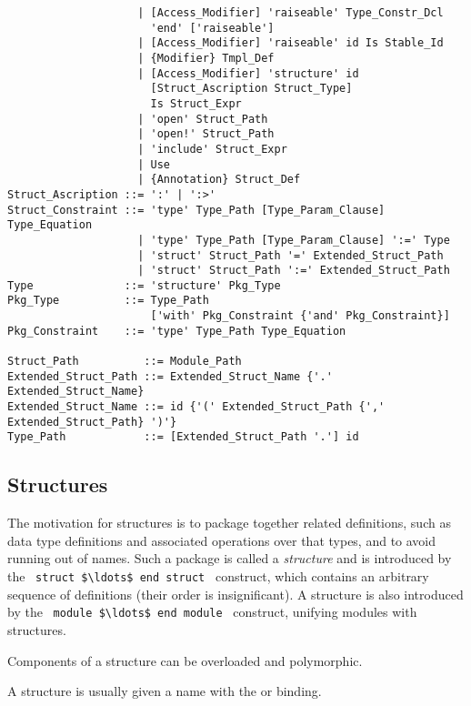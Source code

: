 \begin{lstlisting}
                    | [Access_Modifier] 'raiseable' Type_Constr_Dcl 
                      'end' ['raiseable']
                    | [Access_Modifier] 'raiseable' id Is Stable_Id
                    | {Modifier} Tmpl_Def
                    | [Access_Modifier] 'structure' id 
                      [Struct_Ascription Struct_Type] 
                      Is Struct_Expr
                    | 'open' Struct_Path
                    | 'open!' Struct_Path
                    | 'include' Struct_Expr
                    | Use
                    | {Annotation} Struct_Def
Struct_Ascription ::= ':' | ':>'
Struct_Constraint ::= 'type' Type_Path [Type_Param_Clause] Type_Equation
                    | 'type' Type_Path [Type_Param_Clause] ':=' Type
                    | 'struct' Struct_Path '=' Extended_Struct_Path
                    | 'struct' Struct_Path ':=' Extended_Struct_Path
Type              ::= 'structure' Pkg_Type
Pkg_Type          ::= Type_Path 
                      ['with' Pkg_Constraint {'and' Pkg_Constraint}]
Pkg_Constraint    ::= 'type' Type_Path Type_Equation 

Struct_Path          ::= Module_Path
Extended_Struct_Path ::= Extended_Struct_Name {'.' Extended_Struct_Name}
Extended_Struct_Name ::= id {'(' Extended_Struct_Path {',' Extended_Struct_Path} ')'}
Type_Path            ::= [Extended_Struct_Path '.'] id
\end{lstlisting}






\subsection{Structures}

The motivation for structures is to package together related definitions, such as data type definitions and associated operations over that types, and to avoid running out of names. Such a package is called a {\em structure} and is introduced by the ~\lstinline!struct $\ldots$ end struct!~ construct, which contains an arbitrary sequence of definitions (their order is insignificant). A structure is also introduced by the ~\lstinline!module $\ldots$ end module!~ construct, unifying modules with structures. 

Components of a structure can be overloaded and polymorphic. 

A structure is usually given a name with the  or  binding. 

